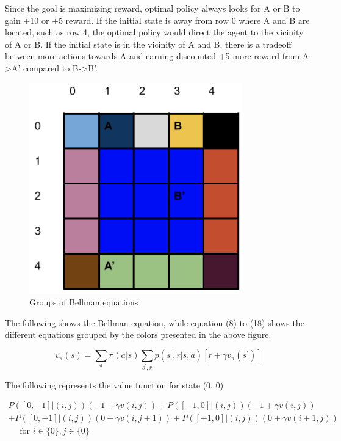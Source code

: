 \documentclass[11pt]{article}
\begin{document}
\noindent
Since the goal is maximizing reward, optimal policy always looks for A or B to
gain +10 or +5 reward. If the initial state is away from row 0 where A and B are
located, such as row 4, the optimal policy would direct the agent to the
vicinity of A or B. If the initial state is in the vicinity of A and B, there is
a tradeoff between more actions towards A and earning discounted +5 more reward
from A->A’ compared to B->B’.
\\

\begin{figure}[h]
\includegraphics[scale=0.4]{bellman_groups}
\centering
\caption{Groups of Bellman equations}
\end{figure}

\noindent
The following shows the Bellman equation, while equation (8) to (18) shows the different
equations grouped by the colors presented in the above figure.

\begin{equation}
v_{\pi}(s)=\sum_{a} \pi(a | s) \sum_{s^{\prime}, r} p\left(s^{\prime}, r | s, a\right)\left[r+\gamma v_{\pi}\left(s^{\prime}\right)\right]
\end{equation}


\noindent
The following represents the value function for state (0, 0)

\begin{equation}
\begin{array}{c}
{P([0,-1] |(i, j))(-1+\gamma v(i, j))+P([-1,0] |(i, j))(-1+\gamma v(i, j))} \\
{+P([0,+1]|(i, j))(0+\gamma v(i, j+1))+P([+1, 0] |(i, j))(0+\gamma v(i+1, j))} \\
{\quad \text { for } i \in\{0\}, j \in\{0\}}
\end{array}
\end{equation}
\end{document}
